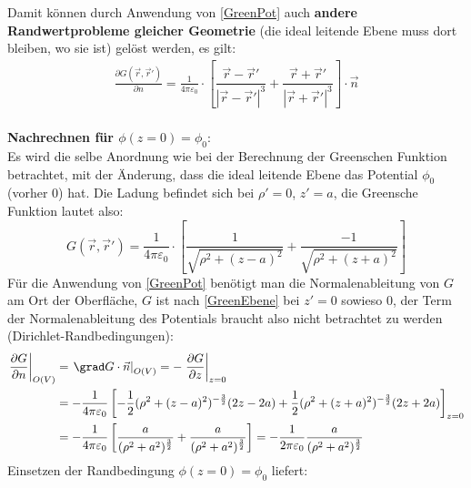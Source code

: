 			   Damit können durch Anwendung von \ref{GreenPot} auch \textbf{andere Randwertprobleme gleicher Geometrie} (die ideal leitende Ebene muss dort bleiben, wo sie ist) gelöst werden, es gilt:
			        \begin{equation}\begin{split}
					        \frac{\partial G(\vec{r} ,\vec{r}' )}{\partial n} = \frac{1}{4\pi\varepsilon_0} \cdot \left[
						        \dfrac{\vec{r}  - \vec{r}' }{|\vec{r}  - \vec{r}' |^3} +
						        \dfrac{\vec{r}  + \vec{r}' }{|\vec{r}  + \vec{r}' |^3}
						        \right]\cdot\vec{n}
				        \end{split}\end{equation}\\
	  \textbf{Nachrechnen für $\phi(z=0)=\phi_0$}:\\
			  Es wird die selbe Anordnung wie bei der Berechnung der Greenschen Funktion betrachtet, mit der Änderung, dass die ideal leitende Ebene das Potential $\phi_0$ (vorher 0) hat. Die Ladung befindet sich bei $\rho'=0$, $z'=a$, die Greensche Funktion lautet also:
			        \begin{equation}
				        G(\vec{r} , \vec{r}' ) = \frac{1}{4\pi\varepsilon_0} \cdot \left[
					        \dfrac{1}{\sqrt{\rho^2 + (z - a)^2}} +
					        \dfrac{-1}{\sqrt{\rho^2 + (z + a)^2}} \right]
			        \end{equation}
			   Für die Anwendung von \ref{GreenPot} benötigt man die Normalenableitung von $G$ am Ort der Oberfläche, $G$ ist nach \ref{GreenEbene} bei $z'=0$ sowieso 0, der Term der Normalenableitung des Potentials braucht also nicht betrachtet zu werden (Dirichlet-Randbedingungen):
			        \begin{equation}\begin{split}\nonumber
					        \left. \frac{\partial G}{\partial n}\right|_{O(V)} & =\left. \grad G \cdot \vec{n}\right|_{O(V)} = - \left. \frac{\partial G}{\partial z}\right|_{z=0}\\
					        &= - \frac{1}{4\pi\varepsilon_0} \left[  -\frac{1}{2} ( \rho^2 + (z-a)^2 )^{-\frac{3}{2}}(2z-2a) +\frac{1}{2} ( \rho^2 + (z+a)^2 )^{-\frac{3}{2}}(2z+2a) \right]_{z=0}\\
					        &= - \frac{1}{4\pi\varepsilon_0} \left[  \frac{a}{(\rho^2 + a^2 )^{\frac{3}{2}}}  + \frac{a}{(\rho^2 + a^2 )^{\frac{3}{2}}} \right] = - \frac{1}{2\pi\varepsilon_0} \frac{a}{(\rho^2 + a^2 )^{\frac{3}{2}}}
				        \end{split}\end{equation}
			   Einsetzen der Randbedingung $\phi(z=0) = \phi_0$ liefert:
